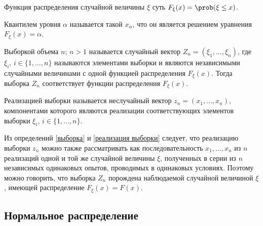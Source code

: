 \documentclass[12pt]{article}
\begin{document}
\begin{definition}
    Функция распределения случайной величины $\xi$ суть $F_\xi(x)=\prob(\xi\leq x)$.
\end{definition}
\begin{definition}
    Квантилем уровня $\alpha$ называется такой $x_\alpha$, что он является решением уравнения $F_\xi(x)=\alpha$.
\end{definition}
\begin{definition}\label{выборка}
    Выборкой объема $n;\,n>1$ называется случайный вектор $Z_n=(\xi_1,\ldots,\xi_n)$, где $\xi_i,\,i\in\{1,\ldots,n\}$ называются элементами выборки и являются независимыми случайными величинами с одной функцией распределения $F_\xi(x)$. Тогда выборка $Z_n$ соответствует функции распределения $F_\xi(x)$.
\end{definition}
\begin{definition}\label{реализация выборки}
    Реализацией выборки называется неслучайный вектор $z_n=(x_1,\ldots,x_n)$, компонентами которого являются реализации соответствующих элементов выборки $\xi_i$, $i\in\{1,\ldots,n\}$.
\end{definition}
\begin{consequence}
    Из определений \ref{выборка} и \ref{реализация выборки} следует, что реализацию выборки $z_n$ можно также рассматривать как последовательность $x_1,\ldots,x_n$ из $n$ реализаций одной и той же случайной величины $\xi$, полученных в серии из $n$ независимых одинаковых опытов, проводимых в одинаковых условиях. Поэтому можно говорить, что выборка $Z_n$ порождена наблюдаемой случайной величиной $\xi$, имеющей распределение $F_\xi(x)=F(x)$.
\end{consequence}

\subsection{Нормальное распределение}
\end{document}
